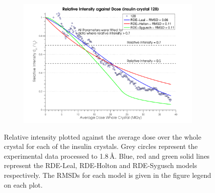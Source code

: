 \begin{figure}[H]
    \ContinuedFloat
    \centering
    \begin{subfigure}[b]{1\textwidth}
        \centering
        \includegraphics[width=\textwidth]{figures/dwd/relintplot128.pdf}
        \caption{}
        \label{Relative Intensity Plots - 128}
    \end{subfigure}
    \caption{Relative intensity plotted against the average dose over the whole crystal for each of the insulin crystals. Grey circles represent the experimental data processed to 1.8\,\AA. Blue, red and green solid lines represent the RDE-Leal, RDE-Holton and RDE-Sygusch models respectively. The RMSDs for each model is given in the figure legend on each plot.}
    \label{fig:Relative Intensity Plots}
\end{figure}



